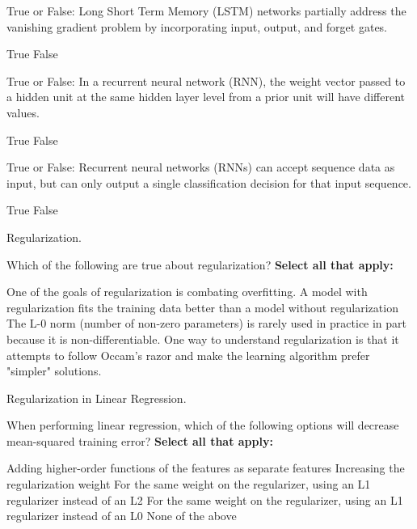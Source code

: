 \documentclass[11pt,addpoints,answers]{exam}
\begin{document}
\begin{questions}
    
    \question[1] True or False: Long Short Term Memory (LSTM) networks partially address the vanishing gradient problem by incorporating input, output, and forget gates.
        \begin{checkboxes}
            \choice True
            \choice False
        \end{checkboxes}
    
    
    \question[1] True or False: In a recurrent neural network (RNN), the weight vector passed to a hidden unit at the same hidden layer level from a prior unit will have different values.
        \begin{checkboxes}
            \choice True
            \choice False
        \end{checkboxes}
    
    
    \question[1] True or False: Recurrent neural networks (RNNs) can accept sequence data as input, but can only output a single classification decision for that input sequence.
        \begin{checkboxes}
            \choice True
            \choice False
        \end{checkboxes}
    
    
    \question[2] Regularization.

Which of the following are true about regularization?
    \textbf{Select all that apply:}
    {%
    \checkboxchar{$\Box$} \checkedchar{$\blacksquare$}
    \begin{checkboxes}
        \choice One of the goals of regularization is combating overfitting.  
        \choice A model with regularization fits the training data better than a model without regularization 
        \choice The L-0 norm (number of non-zero parameters) is rarely used in practice in part because it is non-differentiable. 
        \choice One way to understand regularization is that it attempts to follow Occam's razor and make the learning algorithm prefer "simpler" solutions.
    \end{checkboxes}
    }
    
    
\question[2] Regularization in Linear Regression. 

When performing linear regression, which of the following options will decrease mean-squared training error? \textbf{Select all that apply:}
        {%
    \checkboxchar{$\Box$} \checkedchar{$\blacksquare$}
        \begin{checkboxes}
        \choice Adding higher-order functions of the features as separate features
        \choice Increasing the regularization weight
        \choice For the same weight on the regularizer, using an L1 regularizer instead of an L2
        \choice For the same weight on the regularizer, using an L1 regularizer instead of an L0
        \choice None of the above
        \end{checkboxes}
        }

\end{questions}
\end{document}
